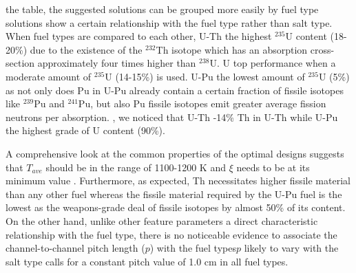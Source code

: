     \DIFdelbegin {}\DIFdelend \DIFaddbegin {}\DIFaddend the table, the suggested solutions can be grouped more easily by fuel type \DIFdelbegin {}\DIFdelend \DIFaddbegin {}\DIFaddend solutions show a certain relationship with the fuel type rather than \DIFaddbegin {}\DIFaddend salt type. When \DIFdelbegin {}\DIFdelend \DIFaddbegin {}\DIFaddend fuel types are compared to each other, \DIFdelbegin {}\DIFdelend U-Th \DIFdelbegin {}\DIFdelend \DIFaddbegin {}\DIFaddend the highest $^{235}$U content (18-20\%) due to the existence of the $^{232}$Th isotope which has an absorption cross-section approximately four times higher than $^{238}$U. U \DIFdelbegin {}\DIFdelend \DIFaddbegin {}\DIFaddend top performance when a moderate amount of $^{235}$U (14-15\%) is used. U-Pu \DIFdelbegin {}\DIFdelend \DIFaddbegin {}\DIFaddend the lowest amount of $^{235}$U (5\%) as not only does Pu in U-Pu already contain a certain fraction of fissile isotopes like $^{239}$Pu and $^{241}$Pu, but also Pu fissile isotopes emit greater average fission neutrons per absorption. \DIFdelbegin {}\DIFdelend \DIFaddbegin {}\DIFaddend , we noticed that \DIFdelbegin {}\DIFdelend U-Th \DIFdelbegin {}\DIFdelend \DIFaddbegin {}-14\% Th in U-Th while \DIFdelbegin {}\DIFdelend U-Pu \DIFdelbegin {}\DIFdelend \DIFaddbegin {}\DIFaddend the highest grade of U content (90\%).

    A comprehensive look at the common properties of the optimal designs suggests that $T_{ave}$ should be in the range of 1100-1200 K and $\xi$ needs to be at its minimum value \DIFdelbegin {}\DIFdelend \DIFaddbegin \DIFadd{(}\DIFaddbegin \DIFadd{)}\DIFaddend . Furthermore, as expected, Th necessitates higher fissile material than any other fuel \DIFdelbegin {}\DIFdelend \DIFaddbegin {}\DIFaddend whereas the fissile material required by the U-Pu fuel is the lowest as the \DIFdelbegin {}\DIFdelend weapons-grade \DIFdelbegin {}\DIFdelend \DIFaddbegin {}\DIFaddend deal of fissile isotopes by almost 50\% of its content. On the other hand, unlike \DIFaddbegin {}\DIFaddend other feature parameters \DIFdelbegin {}\DIFdelend \DIFaddbegin {}\DIFaddend a direct characteristic relationship with the fuel type, there is no noticeable evidence to associate the channel-to-channel pitch length ($p$) with the fuel types\DIFdelbegin {}\DIFdelend \DIFaddbegin {}\DIFaddend $p$ \DIFdelbegin {}\DIFdelend \DIFaddbegin {}\DIFaddend likely to vary with the salt type \DIFdelbegin {}\DIFdelend \DIFaddbegin {}\DIFaddend calls for a constant pitch value of 1.0 cm in all fuel types.

